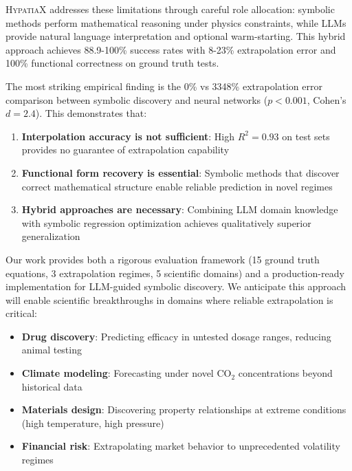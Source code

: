 \documentclass[twoside,11pt]{article}
\begin{document}
\textsc{HypatiaX} addresses these limitations through careful role allocation: symbolic methods perform mathematical reasoning under physics constraints, while LLMs provide natural language interpretation and optional warm-starting. This hybrid approach achieves 88.9-100\% success rates with 8-23\% extrapolation error and 100\% functional correctness on ground truth tests\citep{lewkowycz2022minerva}\citep{kambhampati2024llms}.

The most striking empirical finding is the 0\% vs 3348\% extrapolation error comparison between symbolic discovery and neural networks ($p < 0.001$, Cohen's $d = 2.4$)\citep{koza1994genetic}\citep{liu2020understanding}\citep{zhou2020universality}. This demonstrates that:

\begin{enumerate}
\item \textbf{Interpolation accuracy is not sufficient}: High $R^2 = 0.93$ on test sets provides no guarantee of extrapolation capability
\item \textbf{Functional form recovery is essential}: Symbolic methods that discover correct mathematical structure enable reliable prediction in novel regimes
\item \textbf{Hybrid approaches are necessary}: Combining LLM domain knowledge with symbolic regression optimization achieves qualitatively superior generalization\citep{la2021contemporary}\citep{liu2020understanding}\citep{neyshabur2017exploring}\citep{zhang2021understanding}\citep{kambhampati2024llms}
\end{enumerate}

Our work provides both a rigorous evaluation framework (15 ground truth equations, 3 extrapolation regimes, 5 scientific domains) and a production-ready implementation for LLM-guided symbolic discovery\citep{koza1994genetic}\citep{virtanen2020scipy}\citep{kambhampati2024llms}. We anticipate this approach will enable scientific breakthroughs in domains where reliable extrapolation is critical:

\begin{itemize}
\item \textbf{Drug discovery}: Predicting efficacy in untested dosage ranges, reducing animal testing\citep{koza1994genetic}
\item \textbf{Climate modeling}: Forecasting under novel CO$_2$ concentrations beyond historical data
\item \textbf{Materials design}: Discovering property relationships at extreme conditions (high temperature, high pressure)
\item \textbf{Financial risk}: Extrapolating market behavior to unprecedented volatility regimes
\end{itemize}
\end{document}
